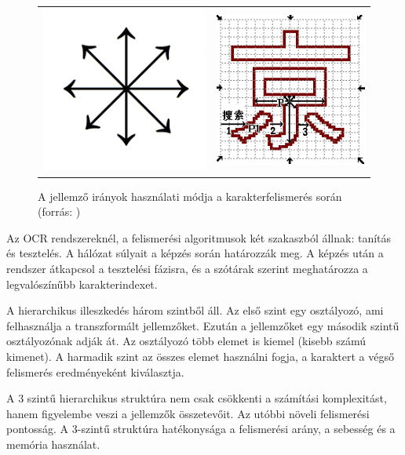 \begin{figure}[h]
\centering
\begin{tabular}{ c c }
\includegraphics[scale=0.6]{images/8direction} & \includegraphics[scale=0.6]{images/ocr_PDC}
\end{tabular}
\caption{A jellemző irányok használati módja a karakterfelismerés során (forrás: \cite{wu2002recognition})}
\label{fig:8direction}
\end{figure}

Az OCR rendszereknél, a felismerési algoritmusok két szakaszból állnak: tanítás és tesztelés. A hálózat súlyait a képzés során határozzák meg. A képzés után a rendszer átkapcsol a tesztelési fázisra, és a szótárak szerint meghatározza a legvalószínűbb karakterindexet.

A hierarchikus illeszkedés három szintből áll. Az első szint egy osztályozó, ami felhasználja a transzformált jellemzőket. Ezután a jellemzőket egy második szintű osztályozónak adják át. Az osztályozó több elemet is kiemel (kisebb számú kimenet). A harmadik szint az összes elemet használni fogja, a karaktert a végső felismerés eredményeként kiválasztja.

A 3 szintű hierarchikus struktúra nem csak csökkenti a számítási komplexitást, hanem figyelembe veszi a jellemzők összetevőit. Az utóbbi növeli felismerési pontosság. A 3-szintű struktúra hatékonysága a felismerési arány, a sebesség és a memória használat.

